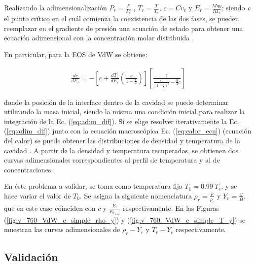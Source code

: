 Realizando la adimensionalización $ P_r = \frac{P}{P_c}$ , $ T_r = \frac{T}{T_c}$, $c = C v_c$ y $E_r = \frac{M g y}{R T_c}$; siendo \textit{c} el punto crítico en el cuál comienza la coexistencia de las dos fases, se pueden reemplazar en el gradiente de presión una ecuación de estado para obtener una ecuación adimensional con la concentración molar distribuida \cite{fogliatto2019simulation}.



En particular, para la EOS de VdW se obtiene:

\begin{align}
	\frac{d c}{d E_r} = - \left[ c + \frac{d T_r}{d E_r} \left( \frac{c}{1 - \frac{c}{3}}\right) \right] \left[	\frac{1}{\frac{T_r}{{\left(1- \frac{c}{3}\right)}^2} - \frac{9}{4} c}  \right] 
	\label{eq:adim_dif}
\end{align} 

donde la posición de la interface dentro de la cavidad se puede determinar utilizando la masa inicial, siendo la misma una condición inicial para realizar la integración de la Ec. (\ref{eq:adim_dif}). Si se elige  resolver iterativamente la Ec. (\ref{eq:adim_dif}) junto con la ecuación macroscópica Ec. (\ref{eq:calor_ecu}) (ecuación del calor) se puede obtener las distribuciones de densidad y temperatura de la cavidad \cite{fogliatto2019simulation}. A partir de la densidad y temperatura recuperadas, se obtienen dos curvas adimensionales correspondientes al perfil de temperatura y al de concentraciones. 

En éste problema a validar, se toma como temperatura fija $T_1 = 0.99 \> T_c$, y se hace variar el valor de  $T_0$. Se asigna la siguiente nomenclatura $\rho_r = \frac{\rho}{\rho_c}$ y  $Y_r = \frac{y}{H}$, que en este caso coinciden con $c$ y $\frac{E_r}{E_{r_{max}}}$ respectivamente. En las Figuras (\ref{fig:v_760_VdW_c_simple_rho_y}) y (\ref{fig:v_760_VdW_c_simple_T_y}) se muestran las curvas adimensionales de $ \rho_r - Y_r $ y $ T_r - Y_r $ respectivamente.
\newline
\subsection{Validación}

